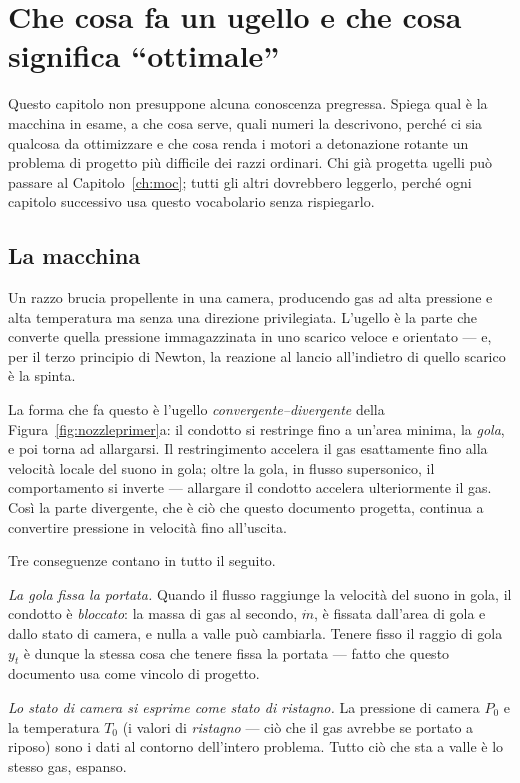 \chapter{Che cosa fa un ugello e che cosa significa ``ottimale''}
\label{ch:nozzle}

Questo capitolo non presuppone alcuna conoscenza pregressa. Spiega
qual è la macchina in esame, a che cosa serve, quali numeri la
descrivono, perché ci sia qualcosa da ottimizzare e che cosa renda i
motori a detonazione rotante un problema di progetto più difficile
dei razzi ordinari. Chi già progetta ugelli può passare al
Capitolo~\ref{ch:moc}; tutti gli altri dovrebbero leggerlo, perché
ogni capitolo successivo usa questo vocabolario senza rispiegarlo.

\section{La macchina}

Un razzo brucia propellente in una camera, producendo gas ad alta
pressione e alta temperatura ma senza una direzione privilegiata.
L'ugello è la parte che converte quella pressione immagazzinata in
uno scarico veloce e orientato --- e, per il terzo principio di
Newton, la reazione al lancio all'indietro di quello scarico è la
spinta.

La forma che fa questo è l'ugello \emph{convergente--divergente}
della Figura~\ref{fig:nozzleprimer}a: il condotto si restringe fino
a un'area minima, la \emph{gola}, e poi torna ad allargarsi. Il
restringimento accelera il gas esattamente fino alla velocità locale
del suono in gola; oltre la gola, in flusso supersonico, il
comportamento si inverte --- allargare il condotto accelera
ulteriormente il gas. Così la parte divergente, che è ciò che questo
documento progetta, continua a convertire pressione in velocità fino
all'uscita.

Tre conseguenze contano in tutto il seguito.

\emph{La gola fissa la portata.} Quando il flusso raggiunge la
velocità del suono in gola, il condotto è \emph{bloccato}: la massa
di gas al secondo, $\dot m$, è fissata dall'area di gola e dallo
stato di camera, e nulla a valle può cambiarla. Tenere fisso il
raggio di gola $y_t$ è dunque la stessa cosa che tenere fissa la
portata --- fatto che questo documento usa come vincolo di progetto.

\emph{Lo stato di camera si esprime come stato di ristagno.} La
pressione di camera $P_0$ e la temperatura $T_0$ (i valori di
\emph{ristagno} --- ciò che il gas avrebbe se portato a riposo) sono
i dati al contorno dell'intero problema. Tutto ciò che sta a valle è
lo stesso gas, espanso.


